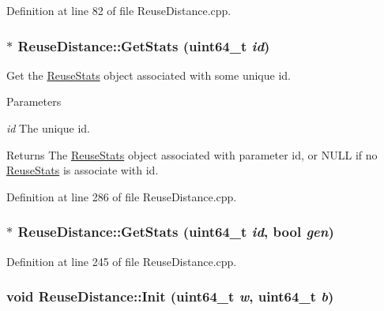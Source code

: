 Definition at line 82 of file ReuseDistance.cpp.

\hypertarget{class_reuse_distance_a771580c25dc5140969919e959e2ebdd1}{
\subsubsection[{GetStats}]{ $\ast$ ReuseDistance::GetStats (uint64\_\-t {\em id})}}
\label{class_reuse_distance_a771580c25dc5140969919e959e2ebdd1}
Get the \hyperlink{class_reuse_stats}{ReuseStats} object associated with some unique id.


\begin{DoxyParams}{Parameters}
\item[{\em id}]The unique id.\end{DoxyParams}
\begin{DoxyReturn}{Returns}
The \hyperlink{class_reuse_stats}{ReuseStats} object associated with parameter id, or NULL if no \hyperlink{class_reuse_stats}{ReuseStats} is associate with id. 
\end{DoxyReturn}


Definition at line 286 of file ReuseDistance.cpp.

\hypertarget{class_reuse_distance_adb13097f908e002f1da8e188d7dc3210}{
\subsubsection[{GetStats}]{ $\ast$ ReuseDistance::GetStats (uint64\_\-t {\em id}, \/  bool {\em gen})}}
\label{class_reuse_distance_adb13097f908e002f1da8e188d7dc3210}


Definition at line 245 of file ReuseDistance.cpp.

\hypertarget{class_reuse_distance_a265c98b7a9460b3312ea5c78dae968cc}{
\subsubsection[{Init}]{\setlength{\rightskip}{0pt plus 5cm}void ReuseDistance::Init (uint64\_\-t {\em w}, \/  uint64\_\-t {\em b})}}
\label{class_reuse_distance_a265c98b7a9460b3312ea5c78dae968cc}


